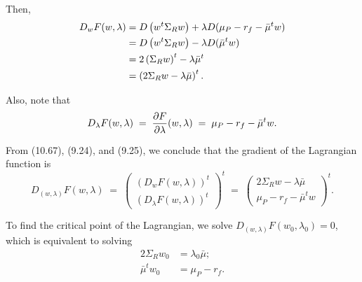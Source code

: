 Then,
\begin{align}
D_wF(w,\lambda) &= D\left(w^t\Sigma_Rw\right) + \lambda D(\mu_P-r_f-\bar\mu^tw) \notag\\
&= D\left(w^t\Sigma_Rw\right) - \lambda D(\bar\mu^tw) \notag\\
&= 2\left(\Sigma_Rw\right)^t - \lambda\bar\mu^t \notag\\
&= \left(2\Sigma_Rw-\lambda\bar\mu\right)^t.
\end{align}

Also, note that
\begin{equation}
D_\lambda F(w,\lambda) \;=\; \frac{\partial F}{\partial \lambda}(w,\lambda) \;=\; \mu_P-r_f-\bar\mu^tw.
\end{equation}

From (10.67), (9.24), and (9.25), we conclude that the gradient of the Lagrangian
function is
\[
D_{(w,\lambda)}F(w,\lambda) \;=\;
\begin{pmatrix} (D_wF(w,\lambda))^t \\ (D_\lambda F(w,\lambda))^t \end{pmatrix}^t
\;=\;
\begin{pmatrix} 2\Sigma_Rw-\lambda\bar\mu \\ \mu_P-r_f-\bar\mu^tw \end{pmatrix}^t.
\]

To find the critical point of the Lagrangian, we solve $D_{(w,\lambda)}F(w_0,\lambda_0)
= 0$, which is equivalent to solving
\begin{align}
2\Sigma_Rw_0 &= \lambda_0\bar\mu; \\
\bar\mu^tw_0 &= \mu_P-r_f.
\end{align}

